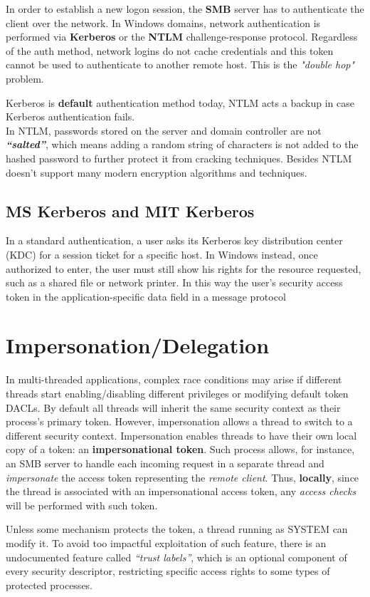 In order to establish a new logon session, the \textbf{SMB} server has to authenticate the client over the network.
In Windows domains, network authentication is
performed via \textbf{Kerberos} or the \textbf{NTLM} challenge-response protocol.
Regardless of the auth method, network logins do not cache credentials and this token cannot be used to
authenticate to another remote host. This is the \textit{"double hop"} problem.

Kerberos is \textbf{default} authentication method today, NTLM acts a backup in case Kerberos authentication fails.\\
In NTLM, passwords stored on the server and domain controller are not
\textit{\textbf{“salted”}}, 
which means adding a random string of characters is not added to the hashed
password to further protect it from cracking techniques.
Besides NTLM doesn't support many modern encryption algorithms and techniques.

\subsection{MS Kerberos and MIT Kerberos}
In a standard authentication, a user asks its Kerberos key distribution center (KDC) for a session ticket for a specific host.
In Windows instead, once authorized to enter, the user must
still show his rights for the resource requested, such as a shared file or
network printer.
In this way the user's security access token in the application-specific data field in a message protocol

\section{Impersonation/Delegation}
In multi-threaded applications, complex race conditions may arise if different threads start enabling/disabling different privileges or modifying default token DACLs.
By default all threads will inherit the same security context as their process’s primary token.
However, impersonation allows a thread to switch to a different security context.
Impersonation enables threads to have their own local copy of a token: an \textbf{impersonational token}.
Such process allows, for instance, an SMB server to handle each incoming request in a separate thread and \textit{impersonate}
the access token representing the \textit{remote client}.
Thus, \textbf{locally}, since the thread is associated with an impersonational access token,
any \textit{access checks} will be performed with such token.

Unless some mechanism protects the token, a thread running as
SYSTEM can modify it.
To avoid too impactful exploitation of such feature, there is an undocumented feature called \textit{“trust labels”}, 
which is an optional component of
every security descriptor,
restricting specific access rights to
some types of protected processes.
